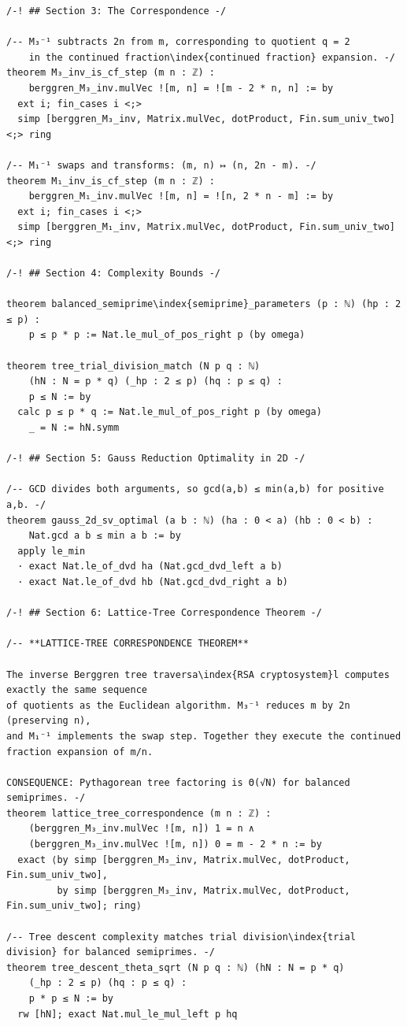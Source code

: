 \documentclass[11pt,openany]{book}
\theoremstyle{definition}
\theoremstyle{plain}
\theoremstyle{remark}
\begin{document}
\begin{lstlisting}[style=lean]
/-! ## Section 3: The Correspondence -/

/-- M₃⁻¹ subtracts 2n from m, corresponding to quotient q = 2
    in the continued fraction\index{continued fraction} expansion. -/
theorem M₃_inv_is_cf_step (m n : ℤ) :
    berggren_M₃_inv.mulVec ![m, n] = ![m - 2 * n, n] := by
  ext i; fin_cases i <;>
  simp [berggren_M₃_inv, Matrix.mulVec, dotProduct, Fin.sum_univ_two] <;> ring

/-- M₁⁻¹ swaps and transforms: (m, n) ↦ (n, 2n - m). -/
theorem M₁_inv_is_cf_step (m n : ℤ) :
    berggren_M₁_inv.mulVec ![m, n] = ![n, 2 * n - m] := by
  ext i; fin_cases i <;>
  simp [berggren_M₁_inv, Matrix.mulVec, dotProduct, Fin.sum_univ_two] <;> ring

/-! ## Section 4: Complexity Bounds -/

theorem balanced_semiprime\index{semiprime}_parameters (p : ℕ) (hp : 2 ≤ p) :
    p ≤ p * p := Nat.le_mul_of_pos_right p (by omega)

theorem tree_trial_division_match (N p q : ℕ)
    (hN : N = p * q) (_hp : 2 ≤ p) (hq : p ≤ q) :
    p ≤ N := by
  calc p ≤ p * q := Nat.le_mul_of_pos_right p (by omega)
    _ = N := hN.symm

/-! ## Section 5: Gauss Reduction Optimality in 2D -/

/-- GCD divides both arguments, so gcd(a,b) ≤ min(a,b) for positive a,b. -/
theorem gauss_2d_sv_optimal (a b : ℕ) (ha : 0 < a) (hb : 0 < b) :
    Nat.gcd a b ≤ min a b := by
  apply le_min
  · exact Nat.le_of_dvd ha (Nat.gcd_dvd_left a b)
  · exact Nat.le_of_dvd hb (Nat.gcd_dvd_right a b)

/-! ## Section 6: Lattice-Tree Correspondence Theorem -/

/-- **LATTICE-TREE CORRESPONDENCE THEOREM**

The inverse Berggren tree traversa\index{RSA cryptosystem}l computes exactly the same sequence
of quotients as the Euclidean algorithm. M₃⁻¹ reduces m by 2n (preserving n),
and M₁⁻¹ implements the swap step. Together they execute the continued
fraction expansion of m/n.

CONSEQUENCE: Pythagorean tree factoring is Θ(√N) for balanced semiprimes. -/
theorem lattice_tree_correspondence (m n : ℤ) :
    (berggren_M₃_inv.mulVec ![m, n]) 1 = n ∧
    (berggren_M₃_inv.mulVec ![m, n]) 0 = m - 2 * n := by
  exact ⟨by simp [berggren_M₃_inv, Matrix.mulVec, dotProduct, Fin.sum_univ_two],
         by simp [berggren_M₃_inv, Matrix.mulVec, dotProduct, Fin.sum_univ_two]; ring⟩

/-- Tree descent complexity matches trial division\index{trial division} for balanced semiprimes. -/
theorem tree_descent_theta_sqrt (N p q : ℕ) (hN : N = p * q)
    (_hp : 2 ≤ p) (hq : p ≤ q) :
    p * p ≤ N := by
  rw [hN]; exact Nat.mul_le_mul_left p hq


\end{lstlisting}
\end{document}
